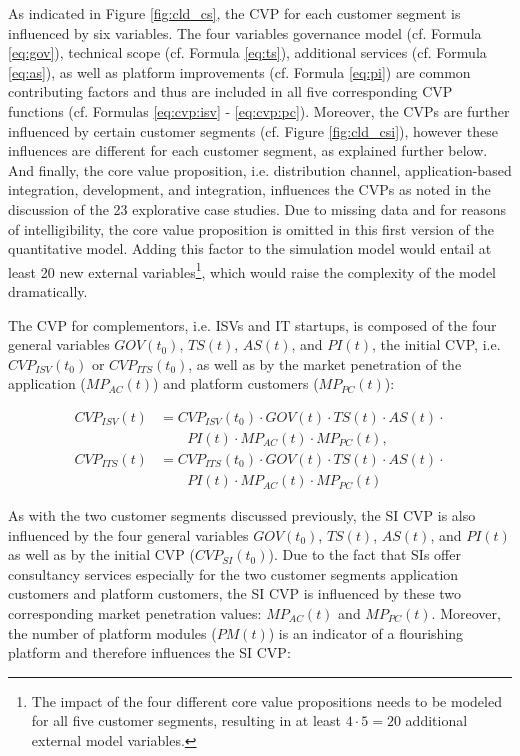 As indicated in Figure \ref{fig:cld_cs}, the \ac{CVP} for each customer segment is influenced by six variables. The four variables governance model (cf. Formula \ref{eq:gov}), technical scope (cf. Formula \ref{eq:ts}), additional services (cf. Formula \ref{eq:as}), as well as platform improvements (cf. Formula \ref{eq:pi}) are common contributing factors and thus are included in all five corresponding \ac{CVP} functions (cf. Formulas \ref{eq:cvp:isv} - \ref{eq:cvp:pc}). Moreover, the \acp{CVP} are further influenced by certain customer segments (cf. Figure \ref{fig:cld_csi}), however these influences are different for each customer segment, as explained further below. And finally, the core value proposition, i.e. distribution channel, application-based integration, development, and integration, influences the \acp{CVP} as noted in the discussion of the 23 explorative case studies. Due to missing data and for reasons of intelligibility, the core value proposition is omitted in this first version of the quantitative model. Adding this factor to the simulation model would entail at least 20 new external variables\footnote{The impact of the four different core value propositions needs to be modeled for all five customer segments, resulting in at least $4 \cdot 5 = 20$ additional external model variables.}, which would raise the complexity of the model dramatically.

The \ac{CVP} for complementors, i.e. \acp{ISV} and \ac{IT} startups, is composed of the four general variables $GOV(t_0)$, $TS(t)$, $AS(t)$, and $PI(t)$, the initial \ac{CVP}, i.e. $CVP_{ISV}(t_0)$ or $ CVP_{ITS}(t_0)$, as well as by the market penetration of the application ($MP_{AC}(t)$) and platform customers ($MP_{PC}(t)$):

\begin{align}
		CVP_{ISV}(t) &= CVP_{ISV}(t_0) \cdot GOV(t) \cdot TS(t) \cdot AS(t) \cdot \nonumber \\ &\qquad PI(t) \cdot MP_{AC}(t) \cdot MP_{PC}(t),\label{eq:cvp:isv}\\
		CVP_{ITS}(t) &= CVP_{ITS}(t_0) \cdot GOV(t) \cdot TS(t) \cdot AS(t) \cdot \nonumber \\ &\qquad PI(t) \cdot MP_{AC}(t) \cdot MP_{PC}(t)\label{eq:cvp:its}
\end{align}

As with the two customer segments discussed previously, the \ac{SI} \ac{CVP} is also influenced by the four general variables $GOV(t_0)$, $TS(t)$, $AS(t)$, and $PI(t)$ as well as by the initial \ac{CVP} ($CVP_{SI}(t_0)$). Due to the fact that \acp{SI} offer consultancy services especially for the two customer segments application customers and platform customers, the \ac{SI} \ac{CVP} is influenced by these two corresponding market penetration values: $MP_{AC}(t)$ and $MP_{PC}(t)$. Moreover, the number of platform modules ($PM(t)$) is an indicator of a flourishing platform and therefore influences the \ac{SI} \ac{CVP}:


